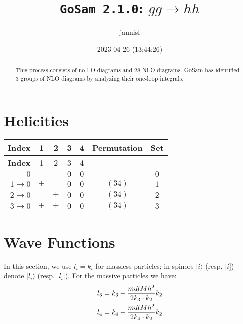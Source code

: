 \documentclass[a4paper]{article}
\title{\texttt{GoSam 2.1.0}: ${g}{g}\rightarrow{h}{h}$}
\author{jannisl}
\date{2023-04-26 (13:44:26)}
\newcommand{\kea}[1]{\vert #1 \rangle}
\newcommand{\keb}[1]{\vert #1 ]}
\begin{document}
\maketitle
\begin{abstract}
\noindent This process consists of no LO diagrams and 28 NLO diagrams. GoSam has identified 3 groups  of NLO diagrams by analyzing their one-loop integrals.
\end{abstract}
\newpage
\tableofcontents
\newpage

\section{Helicities}

\begin{longtable}[c]{r|cccc|c|c}
\bf{Index} &1&2&3&4 & Permutation & Set\\
\hline
\endfirsthead
\bf{Index} &1&2&3&4\\
\hline
\endhead 
$0$& $-$& $-$& $0$& $0$ &  & $0$ \\
$1\rightarrow 0$& $+$& $-$& $0$& $0$ & $(34)$ & $1$ \\
$2\rightarrow 0$& $-$& $+$& $0$& $0$ & $(34)$ & $2$ \\
$3\rightarrow 0$& $+$& $+$& $0$& $0$ & $(34)$ & $3$ \\
\end{longtable}
\section{Wave Functions}
In this section, we use $l_i=k_i$ for massless particles;
in spinors $\kea{i}$ (resp. $\keb{i}$) denote $\kea{l_i}$ (resp. $\keb{l_i}$).
For the massive particles we have:
\begin{align}
l_{3} &= k_{3} - \frac{mdlMh^2}{%
      2 k_{3}\cdot k_{2}}k_{2}\\
l_{4} &= k_{4} - \frac{mdlMh^2}{%
      2 k_{4}\cdot k_{2}}k_{2}
\end{align}
\end{document}
